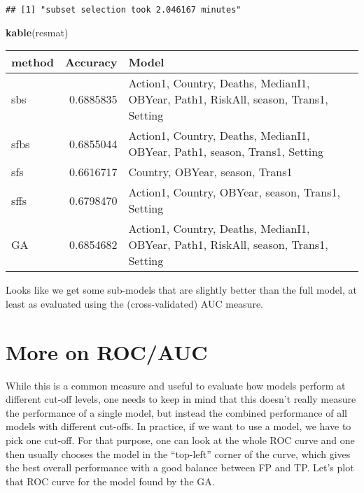 \documentclass[]{article}
\newenvironment{Shaded}{\begin{snugshade}}{\end{snugshade}}
\newcommand{\CommentTok}[1]{\textcolor[rgb]{0.56,0.35,0.01}{\textit{#1}}}
\newcommand{\DataTypeTok}[1]{\textcolor[rgb]{0.13,0.29,0.53}{#1}}
\newcommand{\DecValTok}[1]{\textcolor[rgb]{0.00,0.00,0.81}{#1}}
\newcommand{\KeywordTok}[1]{\textcolor[rgb]{0.13,0.29,0.53}{\textbf{#1}}}
\newcommand{\NormalTok}[1]{#1}
\newcommand{\OperatorTok}[1]{\textcolor[rgb]{0.81,0.36,0.00}{\textbf{#1}}}
\newcommand{\StringTok}[1]{\textcolor[rgb]{0.31,0.60,0.02}{#1}}
\begin{document}
\begin{verbatim}
## [1] "subset selection took 2.046167 minutes"
\end{verbatim}

\begin{Shaded}
\begin{Highlighting}[]
\KeywordTok{kable}\NormalTok{(resmat)}
\end{Highlighting}
\end{Shaded}

\begin{longtable}[]{@{}lrl@{}}
\toprule
method & Accuracy & Model\tabularnewline
\midrule
\endhead
sbs & 0.6885835 & Action1, Country, Deaths, MedianI1, OBYear, Path1,
RiskAll, season, Trans1, Setting\tabularnewline
sfbs & 0.6855044 & Action1, Country, Deaths, MedianI1, OBYear, Path1,
season, Trans1, Setting\tabularnewline
sfs & 0.6616717 & Country, OBYear, season, Trans1\tabularnewline
sffs & 0.6798470 & Action1, Country, OBYear, season, Trans1,
Setting\tabularnewline
GA & 0.6854682 & Action1, Country, Deaths, MedianI1, OBYear, Path1,
RiskAll, season, Trans1, Setting\tabularnewline
\bottomrule
\end{longtable}

Looks like we get some sub-models that are slightly better than the full
model, at least as evaluated using the (cross-validated) AUC measure.

\hypertarget{more-on-rocauc}{%
\section{More on ROC/AUC}\label{more-on-rocauc}}

While this is a common measure and useful to evaluate how models perform
at different cut-off levels, one needs to keep in mind that this doesn't
really measure the performance of a single model, but instead the
combined performance of all models with different cut-offs. In practice,
if we want to use a model, we have to pick one cut-off. For that
purpose, one can look at the whole ROC curve and one then usually
chooses the model in the ``top-left'' corner of the curve, which gives
the best overall performance with a good balance between FP and TP.
Let's plot that ROC curve for the model found by the GA.

\begin{Shaded}
\end{Shaded}
\end{document}
